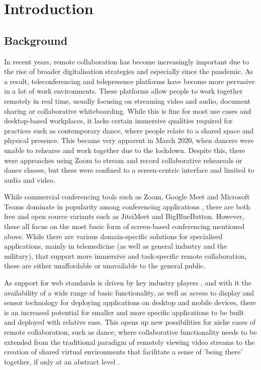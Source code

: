 \chapter{Introduction}

\section{Background}
In recent years, remote collaboration has become increasingly important due to the rise of broader digitalisation strategies and especially since the pandemic. As a result, teleconferencing and telepresence platforms have become more pervasive in a lot of work environments. These platforms allow people to work together remotely in real time, usually focusing on streaming video and audio, document sharing or collaborative whiteboarding. While this is fine for most use cases and desktop-based workplaces, it lacks certain immersive qualities required for practices such as contemporary dance, where people relate to a shared space and physical presence. This became very apparent in March 2020, when dancers were unable to rehearse and work together due to the lockdown. Despite this, there were approaches using Zoom to stream and record collaborative rehearsals or dance classes, but these were confined to a screen-centric interface and limited to audio and video.

While commercial conferencing tools such as Zoom, Google Meet and Microsoft Teams dominate in popularity among conferencing applications \parencite{mostPopularConferencingPlatforms}, there are both free and open source variants such as JitsiMeet and BigBlueButton. However, these all focus on the most basic form of screen-based conferencing mentioned above. While there are various domain-specific solutions for specialised applications, mainly in telemedicine (as well as general industry and the military), that support more immersive and task-specific remote collaboration, these are either unaffordable or unavailable to the general public.

As support for web standards is driven by key industry players \parencite{pushingInteroperabilityForward}, and with it the availability of a wide range of basic functionality, as well as access to display and sensor technology for deploying applications on desktop and mobile devices, there is an increased potential for smaller and more specific applications to be built and deployed with relative ease. This opens up new possibilities for niche cases of remote collaboration, such as dance, where collaborative functionality needs to be extended from the traditional paradigm of remotely viewing video streams to the creation of shared virtual environments that facilitate a sense of 'being there' together, if only at an abstract level \parencite{surveyOfPresence}.

